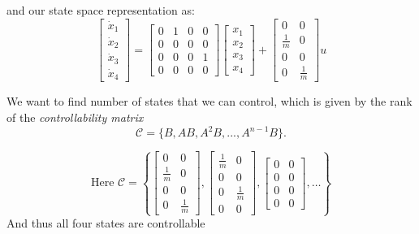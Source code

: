 and our state space representation as:
\begin{equation}
\begin{bmatrix}
\dot{x}_1\\ 
\dot{x}_2\\
\dot{x}_3\\
\dot{x}_4
\end{bmatrix} = \begin{bmatrix}
0 & 1 & 0 & 0 \\
0 & 0 & 0 & 0\\
0 & 0 & 0 & 1\\
0 & 0 & 0 & 0
\end{bmatrix}  \begin{bmatrix}
x_1\\
x_2\\
x_3\\
x_4
\end{bmatrix} + \begin{bmatrix}
0 & 0 \\
\frac{1}{m} & 0 \\
0 & 0 \\
0 & \frac{1}{m}
\end{bmatrix} u
\end{equation}

We want to find number of states that we can control, which is given by the rank of the \emph{controllability matrix}
\begin{equation}
\mathcal{C} = \{ B, AB, A^2B, ... , A^{n-1}B \}.
\end{equation}

\begin{equation}
\textrm{Here }
\mathcal{C}=\left\{
\begin{bmatrix} 
0 & 0\\
\frac{1}{m} & 0 \\
0 & 0 \\
0 & \frac{1}{m}
\end{bmatrix}
,
\begin{bmatrix} 
\frac{1}{m}& 0\\
0 & 0\\
0 & \frac{1}{m}\\
0 & 0
\end{bmatrix},
\begin{bmatrix} 
0 & 0\\
0 & 0\\
0 & 0\\
0 & 0
\end{bmatrix}
, \ldots
 \right\}
\end{equation}
And thus all four states are controllable

